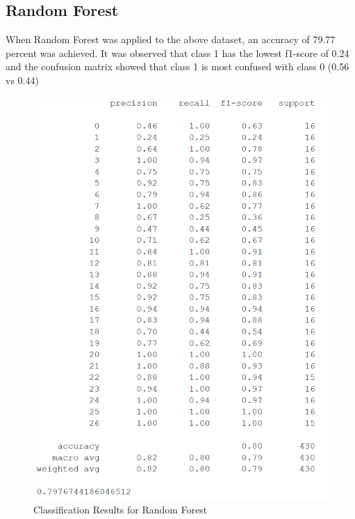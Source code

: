 \documentclass[conference]{IEEEtran}
\begin{document}
\subsection{Random Forest}

When Random Forest was applied to the above dataset, an accuracy of 79.77 percent was achieved. It was observed that class 1 has the lowest f1-score of 0.24 and the confusion matrix showed that class 1 is most confused with class 0 (0.56 vs 0.44)

\begin{figure}[H]
\begin{center}
\includegraphics[scale=0.55]{Image/rf_27_class_report.png}
\caption{\label{rf_27_class_report} Classification Results for Random Forest}
\end{center}
\end{figure}
\end{document}
